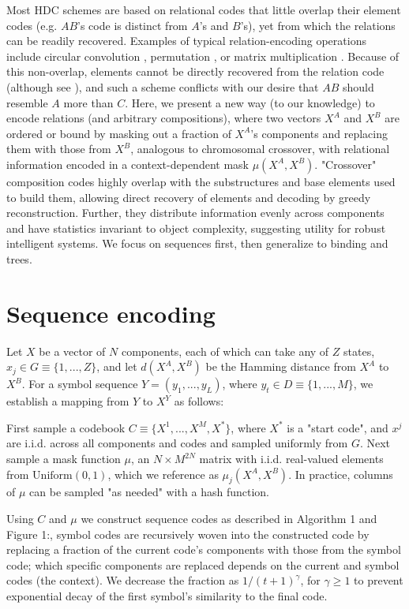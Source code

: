 \documentclass{article}
\begin{document}
Most HDC schemes are based on relational codes that little overlap their element codes (e.g. $AB$'s code is distinct from $A$'s and $B$'s), yet from which the relations can be readily recovered. Examples of typical relation-encoding operations include circular convolution \cite{Plate}, permutation \cite{Sahlgren, Gayler}, or matrix multiplication \cite{Gosmann}. Because of this non-overlap, elements cannot be directly recovered from the relation code (although see \cite{Rachkovskij:2001}), and such a scheme conflicts with our desire that $AB$ should resemble $A$ more than $C$. Here, we present a new way (to our knowledge) to encode relations (and arbitrary compositions), where two vectors $X^A$ and $X^B$ are ordered or bound by masking out a fraction of $X^A$'s components and replacing them with those from $X^B$, analogous to chromosomal crossover, with relational information encoded in a context-dependent mask $\mu(X^A, X^B)$. "Crossover" composition codes highly overlap with the substructures and base elements used to build them, allowing direct recovery of elements and decoding by greedy reconstruction. Further, they distribute information evenly across components and have statistics invariant to object complexity, suggesting utility for robust intelligent systems. We focus on sequences first, then generalize to binding and trees.

\section{Sequence encoding}

Let $X$ be a vector of $N$ components, each of which can take any of $Z$ states, $x_j \in G \equiv \{1,...,Z\}$, and let $d(X^A, X^B)$ be the Hamming distance from $X^A$ to $X^B$. For a symbol sequence $Y = (y_1, ..., y_L)$, where $y_t \in D \equiv \{1, ..., M\}$, we establish a mapping from $Y$ to $X^Y$ as follows:

First sample a codebook $C \equiv \{X^1, ..., X^M, X^*\}$, where $X^*$ is a "start code", and $x^j$ are i.i.d. across all components and codes and sampled uniformly from $G$. Next sample a mask function $\mu$, an $N \times M^{2N}$ matrix with i.i.d. real-valued elements from $\textrm{Uniform}(0, 1)$, which we reference as $\mu_j(X^A, X^B)$. In practice, columns of $\mu$ can be sampled "as needed" with a hash function.

Using $C$ and $\mu$ we construct sequence codes as described in Algorithm 1 and Figure 1:, symbol codes are recursively woven into the constructed code by replacing a fraction of the current code's components with those from the symbol code; which specific components are replaced depends on the current and symbol codes (the context). We decrease the fraction as $1/(t+1)^\gamma$, for $\gamma \geq 1$ to prevent exponential decay of the first symbol's similarity to the final code.
\end{document}
